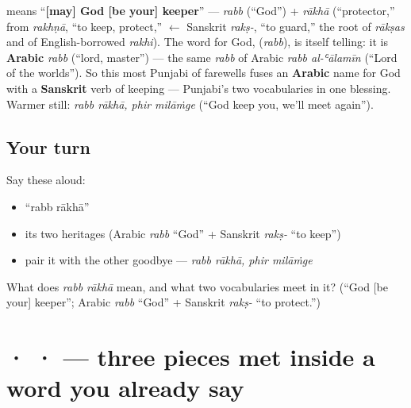 \begin{cousinweb}
\textbf{ } means \textquotedblleft{}\textbf{{[}may{]} God {[}be your{]} keeper}\textquotedblright{} — \emph{rabb} (\textquotedblleft{}God\textquotedblright{}) + \emph{rākhā} (\textquotedblleft{}protector,\textquotedblright{} from \emph{rakhṇā}, \textquotedblleft{}to keep, protect,\textquotedblright{} $\leftarrow$ Sanskrit \emph{rakṣ-}, \textquotedblleft{}to guard,\textquotedblright{} the root of \emph{rākṣas} and of English-borrowed \emph{rakhi}). The word for God, \textbf{} (\emph{rabb}), is itself telling: it is \textbf{Arabic} \emph{rabb} (\textquotedblleft{}lord, master\textquotedblright{}) — the same \emph{rabb} of Arabic \emph{rabb al-ʿālamīn} (\textquotedblleft{}Lord of the worlds\textquotedblright{}). So this most Punjabi of farewells fuses an \textbf{Arabic} name for God with a \textbf{Sanskrit} verb of keeping — Punjabi's two vocabularies in one blessing. Warmer still: \emph{rabb rākhā, phir milāṁge} (\textquotedblleft{}God keep you, we'll meet again\textquotedblright{}).
\end{cousinweb}

\subsection*{Your turn}
Say these aloud:

\begin{itemize}
\raggedright
  \item \textquotedblleft{}rabb rākhā\textquotedblright{}
  \item its two heritages (Arabic \emph{rabb} \textquotedblleft{}God\textquotedblright{} + Sanskrit \emph{rakṣ-} \textquotedblleft{}to keep\textquotedblright{})
  \item pair it with the other goodbye — \emph{rabb rākhā, phir milāṁge}
\end{itemize}

\begin{tcolorbox}[breakable,colback=teal!4,colframe=teal!35!black,title={Before you move on}]
What does \emph{rabb rākhā} mean, and what two vocabularies meet in it? (\textquotedblleft{}God {[}be your{]} keeper\textquotedblright{}; Arabic \emph{rabb} \textquotedblleft{}God\textquotedblright{} + Sanskrit \emph{rakṣ-} \textquotedblleft{}to protect.\textquotedblright{})
\end{tcolorbox}
\section[\texorpdfstring{\pa{ਫ} · \pa{ਗ} · \pa{ਿ} (pha · ga · -i)}{ਫ · ਗ · ਿ (pha · ga · -i)}]{ ·  ·  — three pieces met inside a word you already say}

